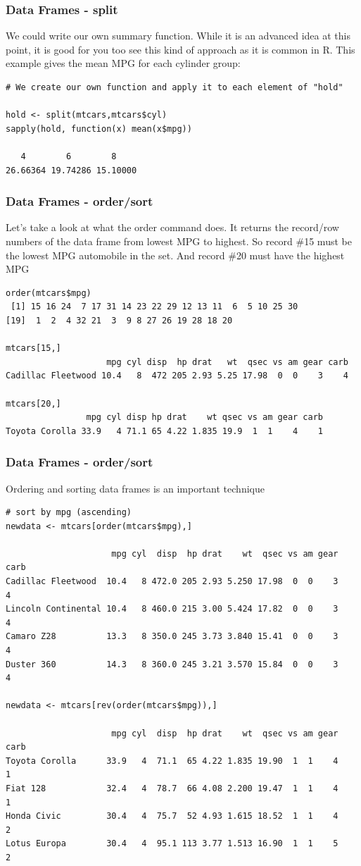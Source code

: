 \documentclass{beamer}
\begin{document}
\begin{frame}[fragile]
\frametitle{Data Frames - split}
We could write our own summary function. While it is an advanced idea at this point, it is good for you too see this kind of approach as it is common in R. This example gives the mean MPG for each cylinder group:
\small
\begin{verbatim}
# We create our own function and apply it to each element of "hold"

hold <- split(mtcars,mtcars$cyl) 
sapply(hold, function(x) mean(x$mpg))

   4        6        8 
26.66364 19.74286 15.10000 
\end{verbatim}
\end{frame}

%



\begin{frame}[fragile]
\frametitle{Data Frames - order/sort}
Let's take a look at what the order command does. It returns the record/row  numbers of the data frame from lowest MPG to highest. So record \#15 must be the lowest MPG automobile in the set. And record \#20 must have the highest MPG
\footnotesize
\begin{verbatim}
order(mtcars$mpg)
 [1] 15 16 24  7 17 31 14 23 22 29 12 13 11  6  5 10 25 30  
[19]  1  2  4 32 21  3  9 8 27 26 19 28 18 20

mtcars[15,]
                    mpg cyl disp  hp drat   wt  qsec vs am gear carb
Cadillac Fleetwood 10.4   8  472 205 2.93 5.25 17.98  0  0    3    4

mtcars[20,]
                mpg cyl disp hp drat    wt qsec vs am gear carb
Toyota Corolla 33.9   4 71.1 65 4.22 1.835 19.9  1  1    4    1
\end{verbatim}
\end{frame}

%


\begin{frame}[fragile]
\frametitle{Data Frames - order/sort}
Ordering and sorting data frames is an important technique 
\footnotesize
\begin{verbatim}
# sort by mpg (ascending)
newdata <- mtcars[order(mtcars$mpg),] 

                     mpg cyl  disp  hp drat    wt  qsec vs am gear carb
Cadillac Fleetwood  10.4   8 472.0 205 2.93 5.250 17.98  0  0    3    4
Lincoln Continental 10.4   8 460.0 215 3.00 5.424 17.82  0  0    3    4
Camaro Z28          13.3   8 350.0 245 3.73 3.840 15.41  0  0    3    4
Duster 360          14.3   8 360.0 245 3.21 3.570 15.84  0  0    3    4

newdata <- mtcars[rev(order(mtcars$mpg)),]  

                     mpg cyl  disp  hp drat    wt  qsec vs am gear carb
Toyota Corolla      33.9   4  71.1  65 4.22 1.835 19.90  1  1    4    1
Fiat 128            32.4   4  78.7  66 4.08 2.200 19.47  1  1    4    1
Honda Civic         30.4   4  75.7  52 4.93 1.615 18.52  1  1    4    2
Lotus Europa        30.4   4  95.1 113 3.77 1.513 16.90  1  1    5    2
\end{verbatim}
\end{frame}
\end{document}
